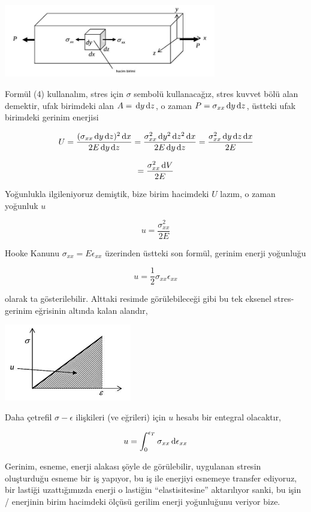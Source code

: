 \documentclass[12pt,fleqn]{article}\usepackage{../../common}
\begin{document}
\includegraphics[width=25em]{phy_020_strs_00_06.jpg}

Formül (4) kullanalım, stres için $\sigma$ sembolü kullanacağız, stres kuvvet
bölü alan demektir, ufak birimdeki alan $A = \,\mathrm{d} y \,\mathrm{d} z$, o zaman
$P = \sigma_{xx} \,\mathrm{d} y \,\mathrm{d} z$, üstteki ufak birimdeki gerinim enerjisi

$$
U = \frac{(\sigma_{xx} \,\mathrm{d} y \,\mathrm{d} z)^2 \,\mathrm{d} x}{2 E \,\mathrm{d} y \,\mathrm{d} z} =
\frac{\sigma_{xx}^2 \,\mathrm{d} y^2 \,\mathrm{d} z^2 \,\mathrm{d} x}{2 E \,\mathrm{d} y \,\mathrm{d} z} =
\frac{\sigma_{xx}^2 \,\mathrm{d} y \,\mathrm{d} z \,\mathrm{d} x}{2 E} 
$$

$$
= \frac{\sigma_{xx}^2 \,\mathrm{d} V}{2 E} 
$$

Yoğunlukla ilgileniyoruz demiştik, bize birim hacimdeki $U$ lazım, o zaman
yoğunluk $u$

$$
u = \frac{\sigma_{xx}^2}{2 E}
$$

Hooke Kanunu $\sigma_{xx} = E \epsilon_{xx}$ üzerinden üstteki son formül,
gerinim enerji yoğunluğu

$$
u = \frac{1}{2} \sigma_{xx} \epsilon_{xx}
$$

olarak ta gösterilebilir. Alttaki resimde görülebileceği gibi bu tek eksenel
stres-gerinim eğrisinin altında kalan alandır,

\includegraphics[width=15em]{phy_020_strs_00_09.jpg}

Daha çetrefil $\sigma-\epsilon$ ilişkileri (ve eğrileri) için $u$ hesabı
bir entegral olacaktır,

$$
u = \int_{0}^{\epsilon_{T}} \sigma_{xx} \,\mathrm{d} \epsilon_{xx} 
$$

Gerinim, esneme, enerji alakası şöyle de görülebilir, uygulanan stresin
oluşturduğu esneme bir iş yapıyor, bu iş ile enerjiyi esnemeye transfer
ediyoruz, bir lastiği uzattığımızda enerji o lastiğin ``elastisitesine''
aktarılıyor sanki, bu işin / enerjinin birim hacimdeki ölçüsü gerilim
enerji yoğunluğunu veriyor bize.
\end{document}
